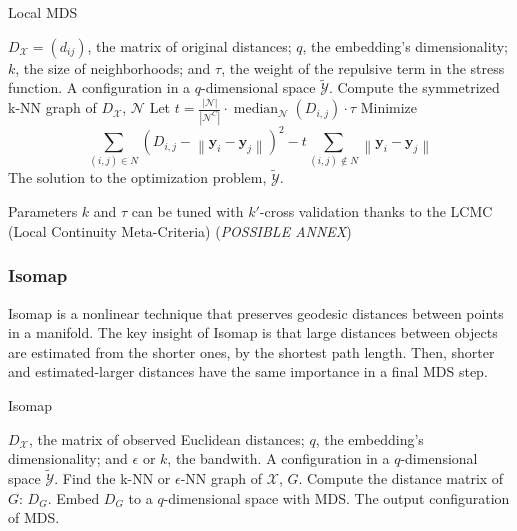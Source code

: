 \begin{algorithm}
    \caption{Local MDS}
    \label{alg:LocalMDS}
    
    \begin{algorithmic}[1]
    \REQUIRE $D_{\mathcal{X}} = (d_{ij})$, the matrix of original distances; $q$, the embedding's dimensionality; $k$, the size of neighborhoods; and $\tau$, the weight of the repulsive term in the stress function.
    \ENSURE A configuration in a $q$-dimensional space $\tilde{\mathcal{Y}}$.
    \STATE Compute the symmetrized k-NN graph of $D_{\mathcal{X}}$, $\mathcal{N}$
    \STATE Let $t=\frac{|\mathcal{N}|}{\left|\mathcal{N}^C\right|} \cdot \operatorname{median}_{\mathcal{N}}\left(D_{i, j}\right) \cdot \tau$
    \STATE Minimize $$\sum_{(i, j) \in N}\left(D_{i, j}-\left\|\mathbf{y}_i-\mathbf{y}_j\right\|\right)^2 - t \sum_{(i, j) \notin N}\left\|\mathbf{y}_i-\mathbf{y}_j\right\|$$
    \RETURN The solution to the optimization problem, $\tilde{\mathcal{Y}}$.
    \end{algorithmic}
\end{algorithm}

Parameters $k$ and $\tau$ can be tuned with $k'$-cross validation thanks to the LCMC (Local Continuity Meta-Criteria) (\textit{POSSIBLE ANNEX})

\subsubsection{Isomap}

Isomap \cite{Tenenbaum2000} is a nonlinear technique that preserves geodesic distances between points in a manifold. The key insight of Isomap is that large distances between objects are estimated from the shorter ones, by the shortest path length. Then, shorter and estimated-larger distances have the same importance in a final MDS step.

\begin{algorithm}
    \caption{Isomap}
    \label{alg:Isomap}
    
    \begin{algorithmic}[1]
    \REQUIRE $D_{\mathcal{X}}$, the matrix of observed Euclidean distances; $q$, the embedding's dimensionality; and $\epsilon$ or $k$, the bandwith.
    \ENSURE A configuration in a $q$-dimensional space $\tilde{\mathcal{Y}}$.
    \STATE Find the k-NN or $\epsilon$-NN graph of $\mathcal{X}$, $G$.
    \STATE Compute the distance matrix of $G$: $D_G$.
    \STATE Embed $D_G$ to a $q$-dimensional space with MDS.
    \RETURN The output configuration of MDS.
    
    \end{algorithmic}
\end{algorithm}

